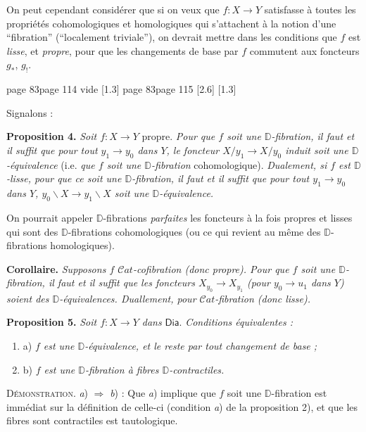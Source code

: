 \documentclass[11pt,leqno]{article}
\newcommand{\printedpage}[1]{\marginnote{\scriptsize\sffamily ed.\ #1}}
\newcommand{\msp}[1]{%
  \begingroup\def\thismsp{#1}\def\blankmsp{page 114 vide}%
  \ifx\thismsp\blankmsp
    \marginnote{\scriptsize\sffamily [114: vide]}[1.3\baselineskip]%
  \else\def\followingmsp{page 115}%
    \ifx\thismsp\followingmsp
      \marginnote{\scriptsize\sffamily [page 115]}[2.6\baselineskip]%
    \else\marginnote{\scriptsize\sffamily [#1]}[1.3\baselineskip]\fi
  \fi\endgroup}
\newcommand{\DD}{\ensuremath{\mathbb{D}}}
\newcommand{\Dia}{\ensuremath{\mathsf{Dia}}}
\newcommand{\Cat}{\ensuremath{\mathcal{C}at}}
\begin{document}
\indent On peut cependant considérer que si on veux que $f : X \to Y$ satisfasse à toutes les propriétés cohomologiques et homologiques qui s'attachent à la notion d'une “fibration” (“localement triviale”), on devrait mettre dans les conditions que $f$ est \textit{lisse}, et \textit{propre}, pour que les changements de base par $f$ commutent aux foncteurs $g_*$, $g_!$. %

\printedpage{51}

\msp{page 83}

Signalons :

\textbf{Proposition 4.} \textit{Soit $f : X \to Y$} propre. \textit{Pour que $f$ soit une $\DD$-fibration, il faut et il suffit que pour tout $y_1 \to y_0$ dans $Y$, le foncteur $X/y_1 \to X/y_0$ induit soit une $\DD$-équivalence} (i.e. \textit{que $f$ soit une $\DD$-fibration} cohomologique). \textit{Dualement, si $f$ est $\DD$-lisse, pour que ce soit une $\DD$-fibration, il faut et il suffit que pour tout $y_1 \to y_0$ dans $Y$, $y_0\backslash X \to y_1\backslash X$ soit une $\DD$-équivalence.}

\indent On pourrait appeler $\DD$-fibrations \textit{parfaites} les foncteurs à la fois propres et lisses qui sont des $\DD$-fibrations cohomologiques (ou ce qui revient au même des $\DD$-fibrations homologiques).

\textbf{Corollaire.} \textit{Supposons $f$ $\Cat$-cofibration (donc propre). Pour que $f$ soit une $\DD$-fibration, il faut et il suffit que les foncteurs $X_{y_0} \to X_{y_1}$ (pour $y_0 \to u_1$ dans $Y$) soient des $\DD$-équivalences. Duallement, pour $\Cat$-fibration (donc lisse).} %

\textbf{Proposition 5.} \textit{Soit $f : X \to Y$ dans} $\Dia$. \textit{Conditions équivalentes :}
\begin{enumerate}[label={}, leftmargin=2em, labelsep=0pt]
\item a) \textit{$f$ est une $\DD$-équivalence, et le reste par tout changement de base ;}
\item b) \textit{$f$ est une $\DD$-fibration à fibres $\DD$-contractiles.}
\end{enumerate}

\textsc{Démonstration.} \textit{a}) $\Rightarrow$ \textit{b}) : Que \textit{a}) implique que $f$ soit une $\DD$-fibration est immédiat sur la définition de celle-ci (condition \textit{a}) de la proposition 2), et que les fibres sont contractiles est tautologique.
\end{document}
